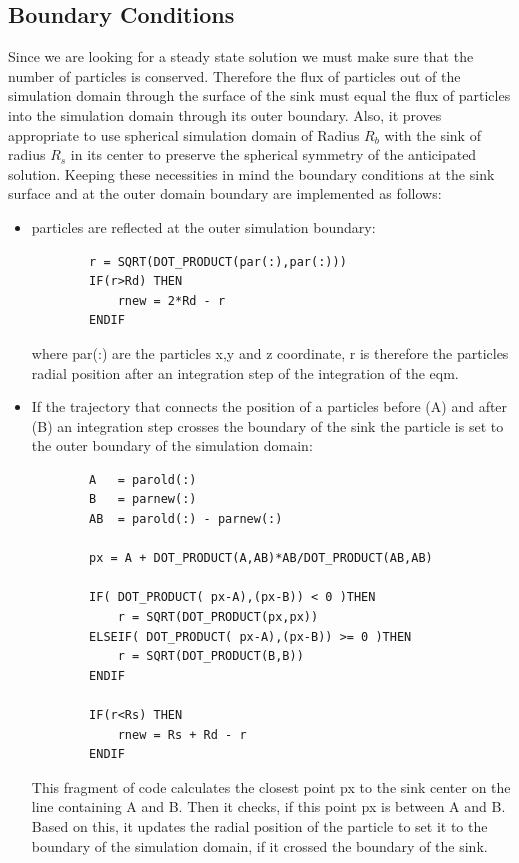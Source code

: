 \subsection{Boundary Conditions}
Since we are looking for a steady state solution we must make sure that the number of particles is conserved. Therefore the flux of particles out of the simulation domain through the surface of the sink must equal the flux of particles into the simulation domain through its outer boundary.
Also, it proves appropriate to use spherical simulation domain of Radius $R_b$ with the sink of radius $R_s$ in its center to preserve the spherical symmetry of the anticipated solution.
Keeping these necessities in mind the boundary conditions at the sink surface and at the outer domain boundary are implemented as follows: \\
\begin{itemize}
    \item particles are reflected at the outer simulation boundary:
        \begin{lstlisting}
        r = SQRT(DOT_PRODUCT(par(:),par(:)))
        IF(r>Rd) THEN
            rnew = 2*Rd - r
        ENDIF
        \end{lstlisting}
        where par(:) are the particles x,y and z coordinate, r is therefore the particles radial position after an integration step of the integration of the eqm.
    \item If the trajectory that connects the position of a particles before (A) and after (B) an integration step crosses the boundary of the sink the particle is set to the outer boundary of the simulation domain:
        \begin{lstlisting}
        A   = parold(:)
        B   = parnew(:)
        AB  = parold(:) - parnew(:)

        px = A + DOT_PRODUCT(A,AB)*AB/DOT_PRODUCT(AB,AB)

        IF( DOT_PRODUCT( px-A),(px-B)) < 0 )THEN
            r = SQRT(DOT_PRODUCT(px,px))
        ELSEIF( DOT_PRODUCT( px-A),(px-B)) >= 0 )THEN
            r = SQRT(DOT_PRODUCT(B,B))
        ENDIF
        
        IF(r<Rs) THEN
            rnew = Rs + Rd - r
        ENDIF
        \end{lstlisting}
        This fragment of code calculates the closest point px to the sink center on the line containing A and B. Then it checks, if this point px is between A and B. Based on this, it updates the radial position of the particle to set it to the boundary of the simulation domain, if it crossed the boundary of the sink.
\end{itemize}
